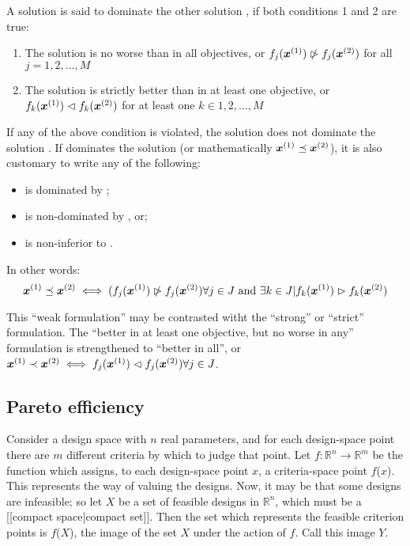   A solution  is said to dominate the other solution , if both conditions 1 and 2 are true:
  \begin{enumerate}
  \item The solution  is no worse than  in all objectives, or $f_j(\boldsymbol{x}^{(1)}) \ntriangleright f_j(\boldsymbol{x}^{(2)})$ for all $j = 1,2,\ldots,M$
  \item The solution  is strictly better than  in at least one objective, or $f_k(\boldsymbol{x}^{(1)}) \vartriangleleft f_k(\boldsymbol{x}^{(2)})$ for at least one $k \in {1, 2,\ldots,M}$
\end{enumerate}

  If any of the above condition is violated, the solution  does not dominate the solution .
  If  dominates the solution  (or mathematically $\boldsymbol{x}^{(1)} \preceq \boldsymbol{x}^{(2)}$), it is also customary to write any of the following:
  \begin{itemize}
  \item {} is dominated by ;
  \item {} is non-dominated by , or;
  \item {} is non-inferior to .
  \end{itemize}

In other words:
\begin{equation}
  \label{eq:3}
  \boldsymbol{x}^{(1)} \preceq \boldsymbol{x}^{(2)} \iff ( f_j(\boldsymbol{x}^{(1)}) \ntriangleright f_j(\boldsymbol{x}^{(2)}) \forall j \in J \textrm{~and~} \exists k \in J | f_k(\boldsymbol{x}^{(1)}) \vartriangleright f_k(\boldsymbol{x}^{(2)})
\end{equation}

This ``weak formulation'' may be contrasted witht the ``strong'' or ``strict'' formulation.
The ``better in at least one objective, but no worse in any'' formulation is strengthened to ``better in all'', or $\boldsymbol{x}^{(1)} \prec \boldsymbol{x}^{(2)} \iff f_j(\boldsymbol{x}^{(1)}) \vartriangleleft f_j(\boldsymbol{x}^{(2)}) \forall j \in J$.

\subsection{Pareto efficiency}
  Consider a design space with $n$ real parameters, and for each design-space point there are $m$ different criteria by which to judge that point.
  Let $f : \mathbb{R}^n \rightarrow \mathbb{R}^m$ be the function which assigns, to each design-space point $x$, a criteria-space point $f$($x$).
  This represents the way of valuing the designs.
  Now, it may be that some designs are infeasible; so let $X$ be a set of feasible designs in ${\mathbb{R}}^n$, which must be a [[compact space|compact set]].
  Then the set which represents the feasible criterion points is $f$($X$), the image of the set $X$ under the action of $f$.
  Call this image $Y$.

